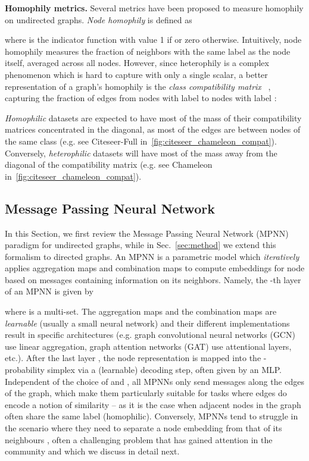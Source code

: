 \documentclass{article}
\theoremstyle{plain}
\theoremstyle{definition}
\theoremstyle{remark}
\begin{document}
\textbf{Homophily metrics.} Several metrics have been proposed to measure homophily on undirected graphs. {\em Node homophily} is defined as

where  is the indicator function with value 1 if  or zero otherwise. Intuitively, node homophily measures the fraction of neighbors with the same label as the node itself, averaged across all nodes.
However, since heterophily is a complex phenomenon which is hard to capture with only a single scalar, a better representation of a graph's homophily is the   \textit{class compatibility matrix} ~\cite{zhu2020beyond},  capturing the fraction of edges from nodes with label  to nodes with label : 


\emph{Homophilic} datasets are expected to have most of the mass of their compatibility matrices concentrated in the diagonal, as most of the edges are between nodes of the same class (e.g. see Citeseer-Full in~\cref{fig:citeseer_chameleon_compat}). Conversely, \emph{heterophilic} datasets will have most of the mass away from the diagonal of the compatibility matrix (e.g. see Chameleon in~\cref{fig:citeseer_chameleon_compat}).

\subsection{Message Passing Neural Network}
In this Section, we first review the Message Passing Neural Network (MPNN) paradigm for undirected graphs, while in Sec.~\ref{sec:method} we extend this formalism to directed graphs. An MPNN is a parametric model which \emph{iteratively} applies  aggregation maps  and combination maps  to compute embeddings  for node  based on messages  containing information on its neighbors. Namely, the -th layer of an MPNN is given by

\noindent where  is a multi-set.
The aggregation maps  and the combination maps  are {\em learnable} (usually a small neural network) and their different implementations  result in specific architectures (e.g.  graph convolutional neural networks (GCN) use linear aggregation, graph attention networks (GAT) use attentional layers, etc.). After the last layer , the node representation  is mapped into the -probability simplex via a (learnable) decoding step, often given by an MLP. Independent of the choice of  and , all MPNNs only send messages along the edges of the graph, which make them particularly suitable for tasks where edges do encode a notion of similarity -- as it is the case when adjacent nodes in the graph often share the same label (homophilic). Conversely, MPNNs tend to struggle in the scenario where they need to separate 
a node embedding from that of its neighbours \cite{nt2019revisiting}, often a challenging problem that has gained attention in the community and which we discuss in detail next.
\end{document}
